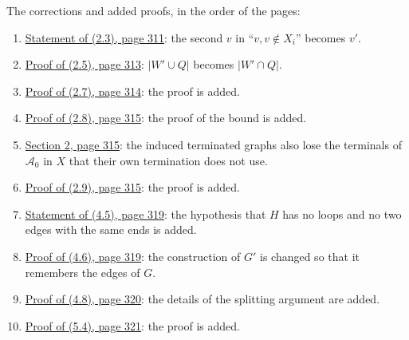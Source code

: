 The corrections and added proofs, in the order of the pages:
\begin{enumerate}\setlength{\itemsep}{1pt}
\item {}\hyperref[fix:2.3]{Statement of (2.3), page 311}: the second $v$ in ``$v, v\notin X_i$'' becomes $v'$.
\item {}\hyperref[fix:2.5-proof]{Proof of (2.5), page 313}: $|W'\cup Q|$ becomes $|W'\cap Q|$.
\item {}\hyperref[fix:2.7-proof-added]{Proof of (2.7), page 314}: the proof is added.
\item {}\hyperref[fix:2.8-proof-added]{Proof of (2.8), page 315}: the proof of the bound is added.
\item {}\hyperref[fix:2-induced]{Section 2, page 315}: the induced terminated graphs also lose the terminals of $\mathscr{A}_0$ in $X$ that their own termination does not use.
\item {}\hyperref[fix:2.9-proof-added]{Proof of (2.9), page 315}: the proof is added.
\item {}\hyperref[fix:4.5]{Statement of (4.5), page 319}: the hypothesis that $H$ has no loops and no two edges with the same ends is added.
\item {}\hyperref[fix:4.6-proof]{Proof of (4.6), page 319}: the construction of $G'$ is changed so that it remembers the edges of $G$.
\item {}\hyperref[fix:4.8-proof-added]{Proof of (4.8), page 320}: the details of the splitting argument are added.
\item {}\hyperref[fix:5.4-proof-added]{Proof of (5.4), page 321}: the proof is added.
\end{enumerate}
